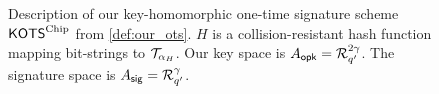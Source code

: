 \begin{figure}
\centering
\begin{pcvstack}
\begin{pchstack}[center]
  \pchspace
  \pchspace
  \end{pchstack}
  \pchspace
  \begin{pchstack}
  \begin{pcvstack}
  \pcvspace
  \pcvspace
  \end{pcvstack}
  \pchspace
\end{pchstack}
\end{pcvstack}
\caption{%
Description of our key-homomorphic one-time signature scheme $\mathsf{KOTS}^{\textup{Chip}}$ from \autoref{def:our_ots}.
$H$ is a collision-resistant hash function mapping bit-strings to $\mathcal{T}_{\alpha_H}$.
Our key space is $A_{\mathsf{opk}} = \mathcal{R}_{q'}^{2\gamma}$.
The signature space is $A_{\mathsf{sig}} = \mathcal{R}_{q'}^\gamma$.
}
\label{fig:otsconstruction}
\end{figure}

